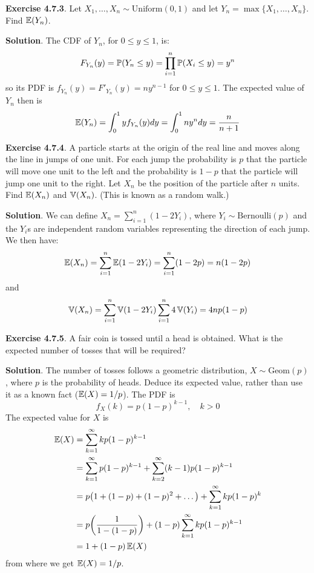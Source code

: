 \textbf{Exercise 4.7.3}. Let
\(X_{1}, \dots, X_{n} \sim \text{Uniform}(0, 1)\) and let
\(Y_{n} = \max \{ X_{1}, \dots, X_{n} \}\). Find \(\operatorname{\mathbb{E}}(Y_{n})\).

\textbf{Solution}. The CDF of \(Y_{n}\), for \(0 \leq y \leq 1\), is:
\[
F_{Y_{n}}(y) = \operatorname{\mathbb{P}}(Y_{n} \leq y) = \prod_{i=1}^{n} \operatorname{\mathbb{P}}(X_{i} \leq y) = y^{n}
\]
so its PDF is \(f_{Y_{n}}(y) = F'_{Y_{n}}(y) = n y^{n-1}\) for
\(0 \leq y \leq 1\).
The expected value of \(Y_{n}\) then is
\[
\operatorname{\mathbb{E}}(Y_{n}) = \int_{0}^{1} y f_{Y_{n}}(y) dy = \int_{0}^{1} n y^{n} dy = \frac{n}{n+1}
\]

\textbf{Exercise 4.7.4}. A particle starts at the origin of the real
line and moves along the line in jumps of one unit. For each jump the
probability is \(p\) that the particle will move one unit to the left
and the probability is \(1 - p\) that the particle will jump one unit to
the right. Let \(X_{n}\) be the position of the particle after \(n\)
units. Find \(\operatorname{\mathbb{E}}(X_{n})\) and \(\operatorname{\mathbb{V}}(X_{n})\). (This is known
as a random walk.)

\textbf{Solution}.
We can define \(X_{n} = \sum_{i=1}^{n} (1 - 2Y_{i})\), where
\(Y_{i} \sim \text{Bernoulli}(p)\) and the \(Y_{i}\)s are independent
random variables representing the direction of each jump.
We then have:
\[
\operatorname{\mathbb{E}}(X_{n}) = \sum_{i=1}^{n} \operatorname{\mathbb{E}}(1 - 2Y_{i}) = \sum_{i=1}^{n} (1 - 2p) = n(1 - 2p)
\]
and
\[
\operatorname{\mathbb{V}}(X_{n}) = \sum_{i=1}^{n} \operatorname{\mathbb{V}}(1 - 2Y_{i}) \sum_{i=1}^{n} 4\operatorname{\mathbb{V}}(Y_{i}) = 4np(1 - p)
\]

\textbf{Exercise 4.7.5}. A fair coin is tossed until a head is obtained.
What is the expected number of tosses that will be required?

\textbf{Solution}. The number of tosses follows a geometric
distribution, \(X \sim \text{Geom}(p)\), where \(p\) is the probability
of heads. Deduce its expected value, rather than use it as a known
fact (\(\operatorname{\mathbb{E}}(X) = 1/p\)). The PDF is
\[
f_X(k) = p (1 - p)^{k - 1}, \quad k > 0
\]
The expected value for \(X\) is
\begin{align*}
\EXP(X) &= \sum_{k=1}^{\infty} k p (1 - p)^{k - 1}  \\
&= \sum_{k=1}^{\infty} p(1-p)^{k-1} + \sum_{k=2}^{\infty} (k - 1) p(1-p)^{k - 1} \\
&= p \left( 1 + (1 - p) + (1 - p)^{2} + \dots \right) + \sum_{k=1}^{\infty} k p(1-p)^{k} \\
&= p \left(\frac{1}{1 - (1 - p)}\right) + (1 - p) \sum_{k=1}^{\infty} k p(1-p)^{k - 1} \\
&= 1 + (1 - p) \EXP(X)
\end{align*}
from where we get \(\operatorname{\mathbb{E}}(X) = 1 / p\).

